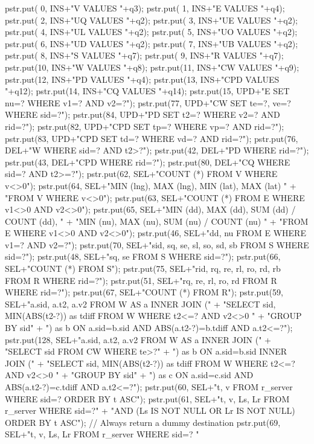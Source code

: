 \documentclass{article}
\theoremstyle{definition}
\begin{document}
  pstr.put( 0, INS+"V VALUES "+q3);
  pstr.put( 1, INS+"E VALUES "+q4);
  pstr.put( 2, INS+"UQ VALUES "+q2);
  pstr.put( 3, INS+"UE VALUES "+q2);
  pstr.put( 4, INS+"UL VALUES "+q2);
  pstr.put( 5, INS+"UO VALUES "+q2);
  pstr.put( 6, INS+"UD VALUES "+q2);
  pstr.put( 7, INS+"UB VALUES "+q2);
  pstr.put( 8, INS+"S VALUES "+q7);
  pstr.put( 9, INS+"R VALUES "+q7);
  pstr.put(10, INS+"W VALUES "+q8);
  pstr.put(11, INS+"CW VALUES "+q9);
  pstr.put(12, INS+"PD VALUES "+q4);
  pstr.put(13, INS+"CPD VALUES "+q12);
  pstr.put(14, INS+"CQ VALUES "+q14);
  pstr.put(15, UPD+"E SET nu=? WHERE v1=? AND v2=?");
  pstr.put(77, UPD+"CW SET te=?, ve=? WHERE sid=?");
  pstr.put(84, UPD+"PD SET t2=? WHERE v2=? AND rid=?");
  pstr.put(82, UPD+"CPD SET tp=? WHERE vp=? AND rid=?");
  pstr.put(83, UPD+"CPD SET td=? WHERE vd=? AND rid=?");
  pstr.put(76, DEL+"W WHERE sid=? AND t2>?");
  pstr.put(42, DEL+"PD WHERE rid=?");
  pstr.put(43, DEL+"CPD WHERE rid=?");
  pstr.put(80, DEL+"CQ WHERE sid=? AND t2>=?");
  pstr.put(62, SEL+"COUNT (*) FROM V WHERE v<>0");
  pstr.put(64, SEL+"MIN (lng), MAX (lng), MIN (lat), MAX (lat) "
      + "FROM V WHERE v<>0");
  pstr.put(63, SEL+"COUNT (*) FROM E WHERE v1<>0 AND v2<>0");
  pstr.put(65, SEL+"MIN (dd), MAX (dd), SUM (dd) / COUNT (dd), "
      + "MIN (nu), MAX (nu), SUM (nu) / COUNT (nu) "
      + "FROM E WHERE v1<>0 AND v2<>0");
  pstr.put(46, SEL+"dd, nu FROM E WHERE v1=? AND v2=?");
  pstr.put(70, SEL+"sid, sq, se, sl, so, sd, sb FROM S WHERE sid=?");
  pstr.put(48, SEL+"sq, se FROM S WHERE sid=?");
  pstr.put(66, SEL+"COUNT (*) FROM S");
  pstr.put(75, SEL+"rid, rq, re, rl, ro, rd, rb FROM R WHERE rid=?");
  pstr.put(51, SEL+"rq, re, rl, ro, rd FROM R WHERE rid=?");
  pstr.put(67, SEL+"COUNT (*) FROM R");
  pstr.put(59, SEL+"a.sid, a.t2, a.v2 FROM W AS a INNER JOIN ("
      + "SELECT sid, MIN(ABS(t2-?)) as tdiff FROM W WHERE t2<=? AND v2<>0 "
      + "GROUP BY sid"
      + ") as b ON a.sid=b.sid AND ABS(a.t2-?)=b.tdiff AND a.t2<=?");
  pstr.put(128, SEL+"a.sid, a.t2, a.v2 FROM W AS a INNER JOIN ("
      + "SELECT sid FROM CW WHERE te>?"
      + ") as b ON a.sid=b.sid INNER JOIN ("
      + "SELECT sid, MIN(ABS(t2-?)) as tdiff FROM W WHERE t2<=? AND v2<>0 "
      + "GROUP BY sid"
      + ") as c ON a.sid=c.sid AND ABS(a.t2-?)=c.tdiff AND a.t2<=?");
  pstr.put(60, SEL+"t, v FROM r_server WHERE sid=? ORDER BY t ASC");
  pstr.put(61, SEL+"t, v, Ls, Lr FROM r_server WHERE sid=?"
      + "AND (Ls IS NOT NULL OR Lr IS NOT NULL) ORDER BY t ASC");
  // Always return a dummy destination
  pstr.put(69, SEL+"t, v, Ls, Lr FROM r_server WHERE sid=? "
\end{document}
